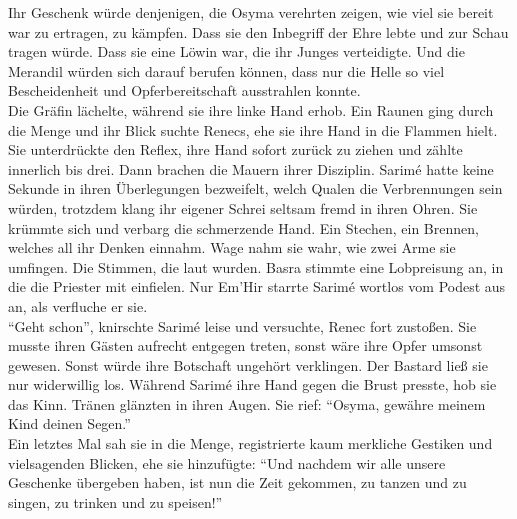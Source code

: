 Ihr Geschenk würde denjenigen, die Osyma verehrten zeigen, wie viel sie bereit war zu ertragen, zu 
kämpfen. Dass sie den Inbegriff der Ehre lebte und zur Schau tragen würde. Dass sie eine Löwin war, 
die ihr Junges verteidigte. Und die Merandil würden sich darauf berufen können, dass nur die Helle 
so viel Bescheidenheit und Opferbereitschaft ausstrahlen konnte.\\
Die Gräfin lächelte, während sie ihre linke Hand erhob. Ein Raunen ging durch die Menge und ihr 
Blick suchte Renecs, ehe sie ihre Hand in die Flammen hielt. Sie unterdrückte den Reflex, ihre Hand 
sofort zurück zu ziehen und zählte innerlich bis drei. Dann brachen die Mauern ihrer Disziplin. 
Sarimé hatte keine Sekunde in ihren Überlegungen bezweifelt, welch Qualen die Verbrennungen sein 
würden, trotzdem klang ihr eigener Schrei seltsam fremd in ihren Ohren. Sie krümmte sich und verbarg 
die schmerzende Hand. Ein Stechen, ein Brennen, welches all ihr Denken einnahm. Wage nahm sie wahr, 
wie zwei Arme sie umfingen. Die Stimmen, die laut wurden. Basra stimmte eine Lobpreisung an, in die 
die Priester mit einfielen. Nur Em'Hir starrte Sarimé wortlos vom Podest aus an, als verfluche er 
sie.\\
``Geht schon'', knirschte Sarimé leise und versuchte, Renec fort zustoßen. Sie musste 
ihren Gästen aufrecht entgegen treten, sonst wäre ihre Opfer umsonst gewesen. Sonst würde ihre 
Botschaft ungehört verklingen. Der Bastard ließ sie nur widerwillig los. Während Sarimé ihre Hand 
gegen die Brust presste, hob sie das Kinn. Tränen glänzten in ihren Augen. Sie rief: ``Osyma, 
gewähre meinem Kind deinen Segen.''\\
Ein letztes Mal sah sie in die Menge, registrierte kaum merkliche Gestiken und vielsagenden 
Blicken, ehe sie hinzufügte: ``Und nachdem wir alle unsere Geschenke übergeben haben, ist nun die 
Zeit gekommen, zu tanzen und zu singen, zu trinken und zu speisen!''\\

